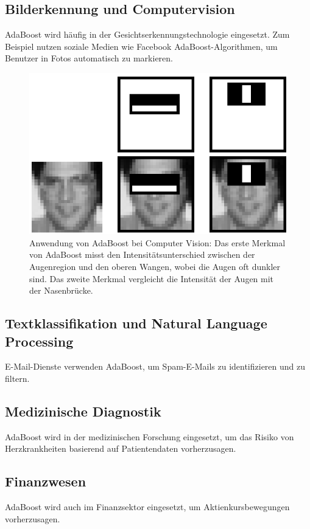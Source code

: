 \documentclass[11pt,a4paper,oneside]{scrartcl}
\begin{document}
\subsection*{Bilderkennung und Computervision}
AdaBoost wird häufig in der Gesichtserkennungstechnologie eingesetzt.
Zum Beispiel nutzen soziale Medien wie Facebook AdaBoost-Algorithmen,
um Benutzer in Fotos automatisch zu markieren. \cite{viola2001rapid}
\begin{figure}
    \centering
    \includegraphics[width=.65\textwidth]{figures/CV_Example.png}
    \caption{Anwendung von AdaBoost bei Computer Vision:
        Das erste Merkmal von AdaBoost misst den Intensitätsunterschied
        zwischen der Augenregion und den oberen Wangen,
        wobei die Augen oft dunkler sind. Das zweite Merkmal vergleicht die
        Intensität der Augen mit der Nasenbrücke.\cite{viola2001rapid}}
\end{figure}
\subsection*{Textklassifikation und Natural Language Processing}
E-Mail-Dienste verwenden AdaBoost, um Spam-E-Mails zu identifizieren und zu filtern.\\
\cite{panwar2022detection}
\subsection*{Medizinische Diagnostik}
AdaBoost wird in der medizinischen Forschung eingesetzt,
um das Risiko von Herzkrankheiten basierend auf Patientendaten vorherzusagen.
\subsection*{Finanzwesen}
AdaBoost wird auch im Finanzsektor eingesetzt,
um Aktienkursbewegungen vorherzusagen.
\end{document}
